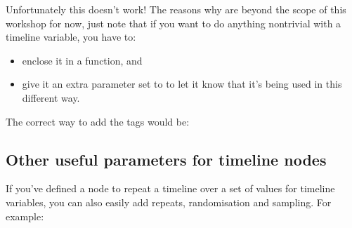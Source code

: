 \documentclass[letterpaper,10pt,english]{sphinxmanual}
\begin{document}
Unfortunately this doesn’t work! The reasons why are beyond the scope of this
workshop \textendash{} for now, just note that if you want to do anything non\sphinxhyphen{}trivial with
a timeline variable, you have to:
\begin{itemize}
\item {} 
enclose it in a function, and

\item {} 
give it an extra parameter set to  to let it know that it’s being used
in this different way.

\end{itemize}

The correct way to add the  tags would be:

\begin{sphinxVerbatim}[commandchars=\\\{\}]
   
   
   
    
      
   
\end{sphinxVerbatim}


\subsection{Other useful parameters for timeline nodes}
\label{\detokenize{jspsych_au:other-useful-parameters-for-timeline-nodes}}
If you’ve defined a node to repeat a timeline over a set of values for timeline
variables, you can also easily add repeats, randomisation and sampling. For
example:

\begin{sphinxVerbatim}[commandchars=\\\{\}]
   
   \PYG{p}{[}\PYG{p}{]}
   
   
   
\end{sphinxVerbatim}
\end{document}
